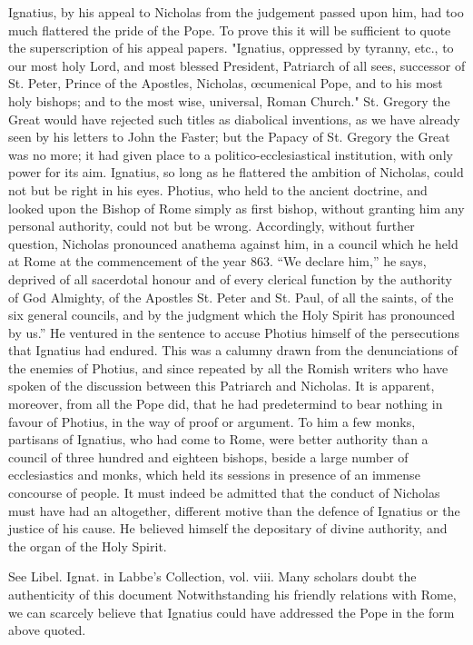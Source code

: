 Ignatius, by his appeal to Nicholas from the judgement passed upon him, had too much flattered the pride of the Pope. To prove this it will be sufficient to quote the superscription of his appeal papers. "Ignatius, oppressed by tyranny, etc., to our most holy Lord, and most blessed President, Patriarch of all sees, successor of St. Peter, Prince of the Apostles, Nicholas, œcumenical Pope, and to his most holy bishops; and to the most wise, universal, Roman Church." St. Gregory the Great would have rejected such titles as diabolical inventions, as we have already seen by his letters to John the Faster; but the Papacy of St. Gregory the Great was no more; it had given place to a politico-ecclesiastical institution, with only power for its aim. Ignatius, so long as he flattered the ambition of Nicholas, could not but be right in his eyes. Photius, who held to the ancient doctrine, and looked upon the Bishop of Rome simply as first bishop, without granting him any personal authority, could not but be wrong. Accordingly, without further question, Nicholas pronounced anathema against him, in a council which he held at Rome at the commencement of the year 863. “We declare him,” he says, deprived of all sacerdotal honour and of every clerical function by the authority of God Almighty, of the Apostles St. Peter and St. Paul, of all the saints, of the six general councils, and by the judgment which the Holy Spirit has pronounced by us.” He ventured in the sentence to accuse Photius himself of the persecutions that Ignatius had endured. This was a calumny drawn from the denunciations of the enemies of Photius, and since repeated by all the Romish writers who have spoken of the discussion between this Patriarch and Nicholas. It is apparent, moreover, from all the Pope did, that he had predetermind to bear nothing in favour of Photius, in the way of proof or argument. To him a few monks, partisans of Ignatius, who had come to Rome, were better authority than a council of three hundred and eighteen bishops, beside a large number of ecclesiastics and monks, which held its sessions in presence of an immense concourse of people. It must indeed be admitted that the conduct of Nicholas must have had an altogether, different motive than the defence of Ignatius or the justice of his cause. He believed himself the depositary of divine authority, and the organ of the Holy Spirit.

See Libel. Ignat. in Labbe's Collection, vol. viii. Many scholars doubt the authenticity of this document Notwithstanding his friendly relations with Rome, we can scarcely believe that Ignatius could have addressed the Pope in the form above quoted.

